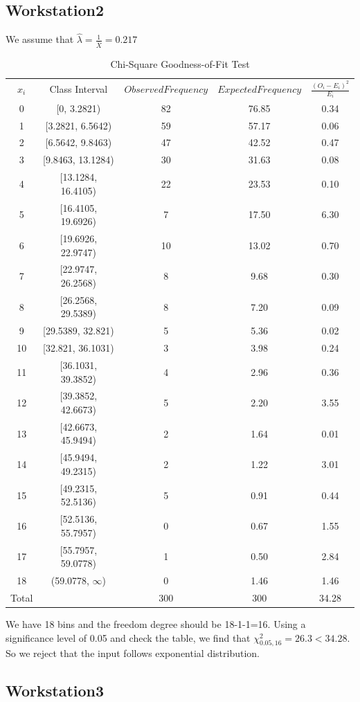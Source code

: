 \documentclass{article}
\begin{document}
\subsection{Workstation2}
We assume that $\hat{\lambda}=\frac{1}{\bar{X}}=0.217$
\begin{table}[htp]
\caption{Chi-Square Goodness-of-Fit Test}
\begin{center}
\begin{tabular}{ccccc}
\hline
$x_i$ & Class Interval & $Observed Frequency$ & $Expected Frequency$ & $\frac{(O_i-E_i)^2}{E_i}$\\
0&[0, 3.2821)&82&76.85&0.34\\
1&[3.2821, 6.5642)&59&57.17&0.06\\
2&[6.5642, 9.8463)&47&42.52&0.47\\
3&[9.8463, 13.1284)&30&31.63&0.08\\
4&[13.1284, 16.4105)&22&23.53&0.10\\
5&[16.4105, 19.6926)&7&17.50&6.30\\
6&[19.6926, 22.9747)&10&13.02&0.70\\
7&[22.9747, 26.2568)&8&9.68&0.30\\
8&[26.2568, 29.5389)&8&7.20&0.09\\
9&[29.5389, 32.821)&5&5.36&0.02\\
10&[32.821, 36.1031)&3&3.98&0.24\\
11&[36.1031, 39.3852)&4&2.96&0.36\\
12&[39.3852, 42.6673)&5&2.20&3.55\\
13&[42.6673, 45.9494)&2&1.64&0.01\\
14&[45.9494, 49.2315)&2&1.22&3.01\\
15&[49.2315, 52.5136)&5&0.91&0.44\\
16&[52.5136, 55.7957)&0&0.67&1.55\\
17&[55.7957, 59.0778)&1&0.50&2.84\\
18&(59.0778, $\infty$)&0&1.46&1.46\\
\hline
Total& &300&300&34.28\\

\hline

\end{tabular}
\end{center}
\label{default}
\end{table}%

We have 18 bins and the freedom degree should be 18-1-1=16. Using a significance level of 0.05 and check the table, we find that $\chi^2_{0.05, 16}=26.3 < 34.28$. So we reject that the input follows exponential distribution.
\subsection{Workstation3}
\end{document}
